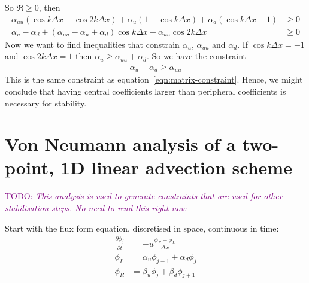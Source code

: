 \documentclass{article}
\newcommand{\TODO}[1]{\textcolor{purple}{TODO: \emph{#1}}}
\begin{document}
So $\Re \geq 0$, then
\begin{align}
\alpha_{uu} \left( \cos k\Delta x - \cos 2k\Delta x \right) + \alpha_u \left( 1 - \cos k \Delta x \right) + \alpha_d \left( \cos k\Delta x - 1 \right) &\geq 0 \\
\alpha_u - \alpha_d + \left( \alpha_{uu} - \alpha_u + \alpha_d \right) \cos k\Delta x - \alpha_{uu} \cos 2k\Delta x &\geq 0
\end{align}
Now we want to find inequalities that constrain $\alpha_u$, $\alpha_{uu}$ and $\alpha_d$.
If $\cos k\Delta x = -1$ and $\cos 2k\Delta x = 1$ then $\alpha_u \geq \alpha_{uu} + \alpha_d$.
So we have the constraint
\begin{align}
\alpha_u - \alpha_d \geq \alpha_{uu}
\end{align}
This is the same constraint as equation~\eqref{eqn:matrix-constraint}.  Hence, we might conclude that having central coefficients larger than peripheral coefficients is necessary for stability.

\newpage

\section*{Von Neumann analysis of a two-point, 1D linear advection scheme}
\TODO{This analysis is used to generate constraints that are used for other stabilisation steps.  No need to read this right now}

Start with the flux form equation, discretised in space, continuous in time:
\begin{align}
\frac{\partial \phi_j}{\partial t} &= - u \frac{\phi_R - \phi_L}{\Delta x} \label{eqn:advection} \\
\phi_L &= \alpha_u \phi_{j-1} + \alpha_d \phi_j \\
\phi_R &= \beta_u \phi_j + \beta_d \phi_{j+1}
\end{align}
\end{document}
